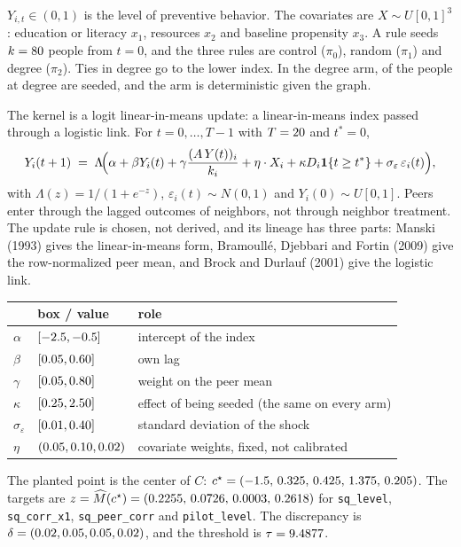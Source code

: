 \documentclass[11pt]{article}
\begin{document}
$Y_{i,t}\in(0,1)$ is the level of preventive behavior. The covariates are $X\sim U[0,1]^3$:
education or literacy $x_1$, resources $x_2$ and baseline propensity $x_3$. A
rule seeds $k=80$ people from $t=0$, and the three rules are control ($\pi_0$),
random ($\pi_1$) and degree ($\pi_2$). Ties in degree go to the lower index. In
the degree arm, \DegreeCutSeeded{} of the \DegreeCutTotal{} people at
degree \DegreeCut{} are seeded, and the arm is deterministic given the
graph.

The kernel is a logit linear-in-means update: a linear-in-means index
passed through a logistic link. For $t=0,\ldots,T-1$ with $T=20$ and
$t^*=0$,
\begin{equation}
  Y_i(t+1)
  \;=\;
  \Lambda\!\Bigl(
    \alpha + \beta Y_i(t)
    + \gamma \frac{(A\,Y(t))_i}{k_i}
    + \eta\cdot X_i
    + \kappa D_i\mathbf{1}\{t\ge t^*\}
    + \sigma_\varepsilon\,\varepsilon_i(t)
  \Bigr),
\end{equation}
with $\Lambda(z)=1/(1+e^{-z})$, $\varepsilon_i(t)\sim N(0,1)$ and $Y_i(0)\sim U[0,1]$. Peers enter through the lagged outcomes of
neighbors, not through neighbor treatment. The update rule is chosen,
not derived, and its lineage has three parts: Manski (1993) gives the
linear-in-means form, Bramoull\'e, Djebbari and Fortin (2009) give the row-normalized peer
mean, and Brock and Durlauf (2001) give the logistic link.

\begin{center}
\small
\begin{tabular}{@{}llp{72mm}@{}}
\toprule
 & box / value & role \\
\midrule
$\alpha$ & $[-2.5,-0.5]$ & intercept of the index \\
$\beta$ & $[0.05,0.60]$ & own lag \\
$\gamma$ & $[0.05,0.80]$ & weight on the peer mean \\
$\kappa$ & $[0.25,2.50]$ & effect of being seeded (the same on every arm) \\
$\sigma_\varepsilon$ & $[0.01,0.40]$ & standard deviation of the shock \\
$\eta$ & $(0.05,0.10,0.02)$ & covariate weights, fixed, not calibrated \\
\bottomrule
\end{tabular}
\end{center}

The planted point is the center of $C$:
$c^\star=(-1.5,\,0.325,\,0.425,\,1.375,\,0.205)$. The targets are
$z=\widehat M(c^\star)=(0.2255,\,0.0726,\,0.0003,\,0.2618)$ for
\texttt{sq\_level}, \texttt{sq\_corr\_x1}, \texttt{sq\_peer\_corr} and \texttt{pilot\_level}.
The discrepancy is $\delta=(0.02,0.05,0.05,0.02)$, and the threshold is
$\tau=9.4877$.
\end{document}
